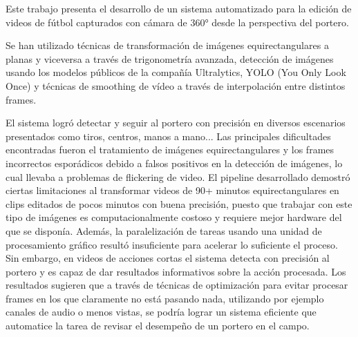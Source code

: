 Este trabajo presenta el desarrollo de un sistema automatizado para la edición de videos de fútbol capturados con cámara de 360° desde la perspectiva del portero.

Se han utilizado técnicas de transformación de imágenes equirectangulares a planas y viceversa a través de trigonometría avanzada, detección de imágenes usando los modelos públicos de la compañía Ultralytics, YOLO (You Only Look Once) y técnicas de smoothing de vídeo a través de interpolación entre distintos frames.

El sistema logró detectar y seguir al portero con precisión en diversos escenarios presentados como tiros, centros, manos a mano... Las principales dificultades encontradas fueron el tratamiento de imágenes equirectangulares y los frames incorrectos esporádicos debido a falsos positivos en la detección de imágenes, lo cual llevaba a problemas de flickering de video. El pipeline desarrollado demostró ciertas limitaciones al transformar videos de 90+ minutos equirectangulares en clips editados de pocos minutos con buena precisión, puesto que trabajar con este tipo de imágenes es computacionalmente costoso y requiere mejor hardware del que se disponía. Además, la paralelización de tareas usando una unidad de procesamiento gráfico resultó insuficiente para acelerar lo suficiente el proceso. Sin embargo, en videos de acciones cortas el sistema detecta con precisión al portero y es capaz de dar resultados informativos sobre la acción procesada. Los resultados sugieren que a través de técnicas de optimización para evitar procesar frames en los que claramente no está pasando nada, utilizando por ejemplo canales de audio o menos vistas, se podría lograr un sistema eficiente que automatice la tarea de revisar el desempeño de un portero en el campo.

